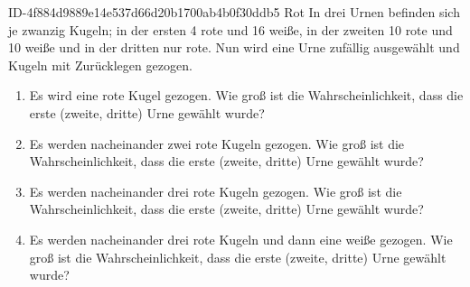 \begin{exercise}
      {ID-4f884d9889e14e537d66d20b1700ab4b0f30ddb5}
      {Rot}
  \ifproblem\problem
    In drei Urnen befinden sich je zwanzig Kugeln; in der ersten 4 rote und
    16 weiße, in der zweiten 10 rote und 10 weiße und in der dritten nur rote.
    Nun wird eine Urne zufällig ausgewählt und Kugeln mit Zurücklegen gezogen.
    \begin{enumerate}
      \item Es wird eine rote Kugel gezogen. Wie groß ist die Wahrscheinlichkeit,
            dass die erste (zweite, dritte) Urne gewählt wurde?
      \item Es werden nacheinander zwei rote Kugeln gezogen. Wie groß ist die
            Wahrscheinlichkeit, dass die erste (zweite, dritte) Urne gewählt wurde?
      \item Es werden nacheinander drei rote Kugeln gezogen. Wie groß ist die
            Wahrscheinlichkeit, dass die erste (zweite, dritte) Urne gewählt wurde?
      \item Es werden nacheinander drei rote Kugeln und dann eine weiße gezogen.
            Wie groß ist die Wahrscheinlichkeit, dass die erste (zweite, dritte)
            Urne gewählt wurde?
    \end{enumerate}
  \fi
\end{exercise}
